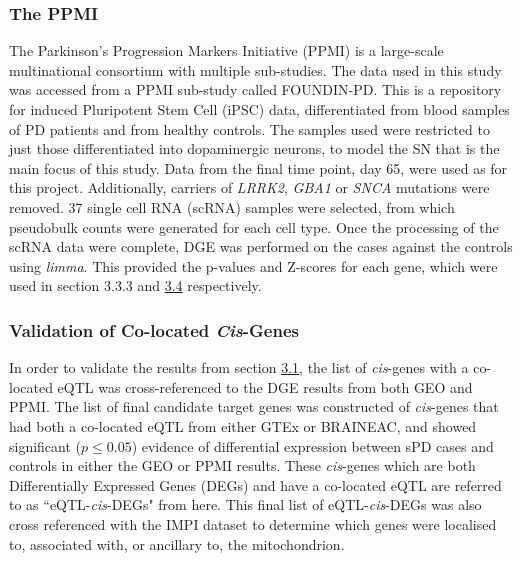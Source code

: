 \documentclass{article}
\begin{document}
\subsubsection{The PPMI}
The Parkinson's Progression Markers Initiative (PPMI)\cite{Marek2011ThePPMI} is a large-scale multinational consortium with multiple sub-studies. The data used in this study was accessed from a PPMI sub-study called FOUNDIN-PD\cite{Bressan2023TheMechanism}. This is a repository for induced Pluripotent Stem Cell (iPSC) data, differentiated from blood samples of PD patients and from healthy controls. The samples used were restricted to just those differentiated into dopaminergic neurons, to model the SN that is the main focus of this study. Data from the final time point, day 65, were used as for this project. Additionally, carriers of \textit{LRRK2}, \textit{GBA1} or \textit{SNCA} mutations were removed. 37 single cell RNA (scRNA) samples were selected, from which pseudobulk counts were generated for each cell type. Once the processing of the scRNA data were complete, DGE was performed on the cases against the controls using \textit{limma}\cite{Ritchie2015LimmaStudies}. This provided the p-values and Z-scores for each gene, which were used in section 3.3.3 and \hyperref[subsec:pathways]{3.4} respectively.
\subsubsection{Validation of Co-located \textit{Cis}-Genes}
In order to validate the results from section \hyperref[subsec:eQTL]{3.1}, the list of \textit{cis}-genes with a co-located eQTL was cross-referenced to the DGE results from both GEO and PPMI. The list of final candidate target genes was constructed of \textit{cis}-genes that had both a co-located eQTL from either GTEx or BRAINEAC, and showed significant ($p\leq0.05$) evidence of differential expression between sPD cases and controls in either the GEO or PPMI results. These \textit{cis}-genes which are both Differentially  Expressed Genes (DEGs) and have a co-located eQTL are referred to as ``eQTL-\textit{cis}-DEGs" from here. This final list of eQTL-\textit{cis}-DEGs was also cross referenced with the IMPI dataset\cite{Smith2016MitoMinerDatabase} to determine which genes were localised to, associated with, or ancillary to, the mitochondrion.
\end{document}
